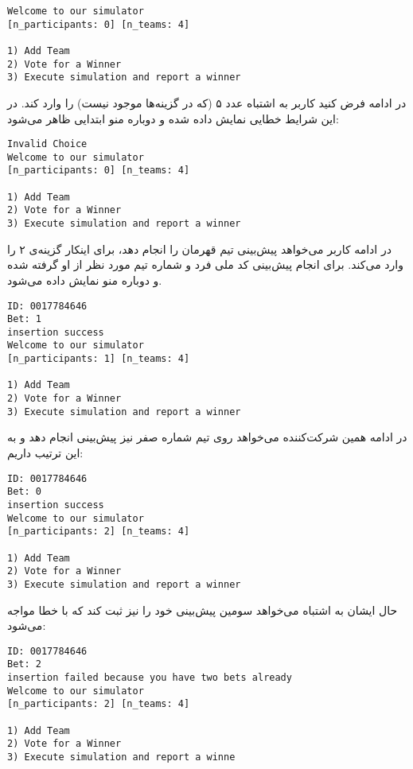 \begin{latin}
\begin{verbatim}
Welcome to our simulator
[n_participants: 0] [n_teams: 4]

1) Add Team
2) Vote for a Winner
3) Execute simulation and report a winner
\end{verbatim}
\end{latin}

در ادامه فرض کنید کاربر به اشتباه عدد ۵ (که در گزینه‌ها موجود نیست) را وارد کند.
در این شرایط خطایی نمایش داده شده و دوباره منو ابتدایی ظاهر می‌شود:

\begin{latin}
\begin{verbatim}
Invalid Choice
Welcome to our simulator
[n_participants: 0] [n_teams: 4]

1) Add Team
2) Vote for a Winner
3) Execute simulation and report a winner
\end{verbatim}
\end{latin}

در ادامه کاربر می‌خواهد پیش‌بینی تیم قهرمان را انجام دهد، برای اینکار گزینه‌ی ۲ را وارد می‌کند.
برای انجام پیش‌بینی کد ملی فرد و شماره تیم مورد نظر از او گرفته شده و دوباره منو نمایش داده می‌شود.

\begin{latin}
\begin{verbatim}
ID: 0017784646
Bet: 1
insertion success
Welcome to our simulator
[n_participants: 1] [n_teams: 4]

1) Add Team
2) Vote for a Winner
3) Execute simulation and report a winner
\end{verbatim}
\end{latin}

در ادامه همین شرکت‌کننده می‌خواهد روی تیم شماره صفر نیز پیش‌بینی انجام دهد و به این ترتیب داریم:

\begin{latin}
\begin{verbatim}
ID: 0017784646
Bet: 0
insertion success
Welcome to our simulator
[n_participants: 2] [n_teams: 4]

1) Add Team
2) Vote for a Winner
3) Execute simulation and report a winner
\end{verbatim}
\end{latin}

حال ایشان به اشتباه می‌خواهد سومین پیش‌بینی خود را نیز ثبت کند که با خطا مواجه می‌شود:

\begin{latin}
\begin{verbatim}
ID: 0017784646
Bet: 2
insertion failed because you have two bets already
Welcome to our simulator
[n_participants: 2] [n_teams: 4]

1) Add Team
2) Vote for a Winner
3) Execute simulation and report a winne
\end{verbatim}
\end{latin}

